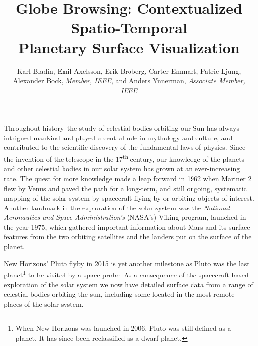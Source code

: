 \documentclass[journal]{vgtc}                %
\title{Globe Browsing: Contextualized Spatio-Temporal \\
Planetary Surface Visualization}
\author{Karl Bladin, Emil Axelsson, Erik Broberg, Carter Emmart, Patric Ljung, \\ Alexander Bock, \textit{Member, IEEE}, and Anders Ynnerman, \textit{Associate Member, IEEE}}
\newcommand{\kallecomment}[1]{\textbf{[-Kalle-~}
    \textcolor{orange}{#1}
    \textbf{~]}}
\newcommand{\emilcomment}[1]{\textbf{[-Emil-~}
    \textcolor{red}{#1}
    \textbf{~]}}
\newcommand{\alexcomment}[1]{\textbf{[-Alex-~}
    \textcolor{magenta}{#1}
    \textbf{~]}}
\newcommand{\dsup}[1]{\textsuperscript{#1}}
\begin{document}

 \label{sec:introduction}
\maketitle


Throughout history, the study of celestial bodies orbiting our Sun has always intrigued mankind and played a central role in mythology and culture, and contributed to the scientific discovery of the fundamental laws of physics.
Since the invention of the telescope in the 17\dsup{th} century, our knowledge of the planets and other celestial bodies in our solar system has grown at an ever-increasing rate.
The quest for more knowledge made a leap forward in 1962 when Mariner 2 flew by Venus and paved the path for a long-term, and still ongoing, systematic mapping of the solar system by spacecraft flying by or orbiting objects of interest.
Another landmark in the exploration of the solar system was the \emph{National Aeronautics and Space Administration's} (NASA's) Viking program, launched in the year 1975, which gathered important information about Mars and its surface features from the two orbiting satellites and the landers put on the surface of the planet.

New Horizons' Pluto flyby in 2015 is yet another milestone as Pluto was the last planet\footnote{When New Horizons was launched in 2006, Pluto was still defined as a planet. It has since been reclassified as a dwarf planet.} to be visited by a space probe. As a consequence of the spacecraft-based exploration of the solar system we now have detailed surface data from a range of celestial bodies orbiting the sun, including some located in the most remote places of the solar system. 
\end{document}
